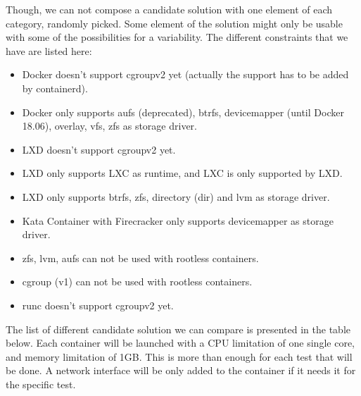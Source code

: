 Though, we can not compose a candidate solution with one element of each category, randomly picked.  Some element of the solution might only be usable with some of the possibilities for a variability.  The different constraints that we have are listed here:
\begin{itemize}
  \renewcommand\labelitemi{--}
  \item Docker doesn't support cgroupv2 yet (actually the support has to be added by containerd).
  \item Docker only supports aufs (deprecated), btrfs, devicemapper (until Docker 18.06), overlay, vfs, zfs as storage driver.
  \item LXD doesn't support cgroupv2 yet.
  \item LXD only supports LXC as runtime, and LXC is only supported by LXD.
  \item LXD only supports btrfs, zfs, directory (dir) and lvm as storage driver.
  \item Kata Container with Firecracker only supports devicemapper as storage driver.
  \item zfs, lvm, aufs can not be used with rootless containers.
  \item cgroup (v1) can not be used with rootless containers.
  \item runc doesn't support cgroupv2 yet.
\end{itemize}

The list of different candidate solution we can compare is presented in the table below.  Each container will be launched with a CPU limitation of one single core, and memory limitation of 1GB.  This is more than enough for each test that will be done.  A network interface will be only added to the container if it needs it for the specific test.\\\\

